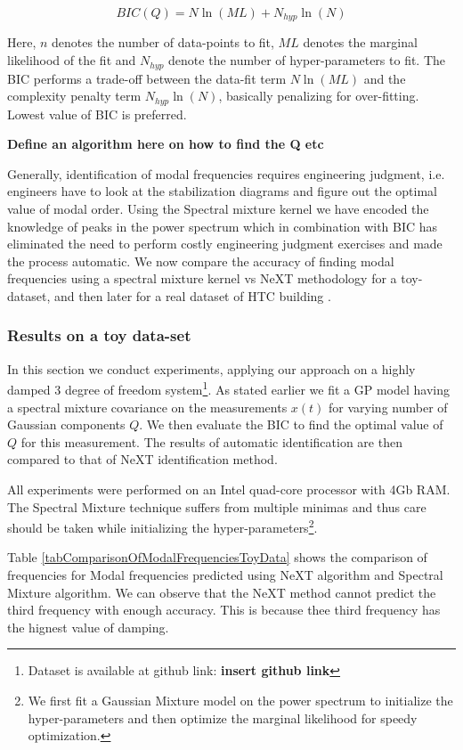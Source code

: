 \begin{mdframed}[hidealllines=true,backgroundcolor=blue!20]
\begin{equation}\label{eq:BIC}
    BIC(Q) = N\ln(ML) + N_{hyp}\ln(N)
\end{equation}

Here, $n$ denotes the number of data-points to fit, $ML$ denotes the marginal likelihood of the fit and $N_{hyp}$ denote the number of hyper-parameters to fit. The BIC performs a trade-off between the data-fit term $N\ln(ML)$ and the complexity penalty term $N_{hyp}\ln(N)$, basically penalizing for over-fitting. Lowest value of BIC is preferred. 
\end{mdframed}

\textbf{Define an algorithm here on how to find the Q etc}

Generally, identification of modal frequencies requires engineering judgment, i.e. engineers have to look at the stabilization diagrams and figure out the optimal value of modal order. Using the Spectral mixture kernel we have encoded the knowledge of peaks in the power spectrum which in combination with BIC has eliminated the need to perform costly engineering judgment exercises and made the process automatic. We now compare the accuracy of finding modal frequencies using a spectral mixture kernel vs NeXT methodology for a toy-dataset, and then later for a real dataset of HTC building \cite{brincker2000modal}.

\subsubsection{Results on a toy data-set}
In this section we conduct experiments, applying our approach on a highly damped 3 degree of freedom system\footnote{Dataset is available at github link: \textbf{insert github link}}. As stated earlier we fit a GP model having a spectral mixture covariance on the measurements $x(t)$ for varying number of Gaussian components $Q$. We then evaluate the BIC to find the optimal value of $Q$ for this measurement. The results of automatic identification are then compared to that of NeXT identification method. 

All experiments were performed on an Intel quad-core processor with 4Gb RAM. The Spectral Mixture technique suffers from multiple minimas and thus care should be taken while initializing the hyper-parameters\footnote{We first fit a Gaussian Mixture model on the power spectrum to initialize the hyper-parameters and then optimize the marginal likelihood for speedy optimization.}.  

Table \ref{tabComparisonOfModalFrequenciesToyData} shows the comparison of frequencies for Modal frequencies predicted using NeXT algorithm and Spectral Mixture algorithm. We can observe that the NeXT method cannot predict the third frequency with enough accuracy. This is because thee third frequency has the hignest value of damping.

